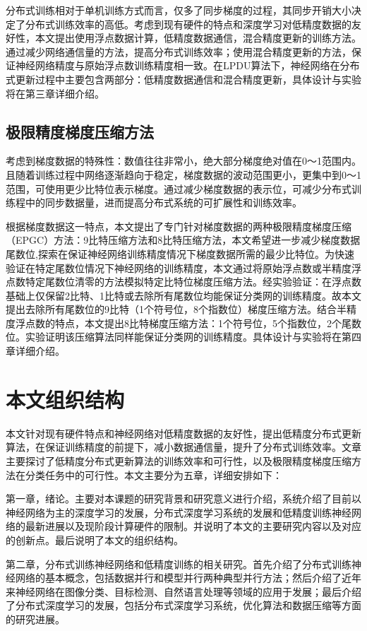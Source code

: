 分布式训练相对于单机训练方式而言，仅多了同步梯度的过程，其同步开销大小决定了分布式训练效率的高低。考虑到现有硬件的特点和深度学习对低精度数据的友好性，本文提出使用浮点数据计算，低精度数据通信，混合精度更新的训练方法。通过减少网络通信量的方法，提高分布式训练效率；使用混合精度更新的方法，保证神经网络精度与原始浮点数训练精度相一致。在LPDU算法下，神经网络在分布式更新过程中主要包含两部分：低精度数据通信和混合精度更新，具体设计与实验将在第三章详细介绍。

\subsection{极限精度梯度压缩方法}
考虑到梯度数据的特殊性：数值往往非常小，绝大部分梯度绝对值在0～1范围内。且随着训练过程中网络逐渐趋向于稳定，梯度数据的波动范围更小，更集中到0～1范围，可使用更少比特位表示梯度。通过减少梯度数据的表示位，可减少分布式训练程中的同步数据量，进而提高分布式系统的可扩展性和训练效率。

根据梯度数据这一特点，本文提出了专门针对梯度数据的两种极限精度梯度压缩（EPGC）方法：9比特压缩方法和8比特压缩方法，本文希望进一步减少梯度数据尾数位,探索在保证神经网络训练精度情况下梯度数据所需的最少比特位。为快速验证在特定尾数位情况下神经网络的训练精度，本文通过将原始浮点数或半精度浮点数特定尾数位清零的方法模拟特定比特位梯度压缩方法。经实验验证：在浮点数基础上仅保留2比特、1比特或去除所有尾数位均能保证分类网的训练精度。故本文提出去除所有尾数位的9比特（1个符号位，8个指数位）梯度压缩方法。结合半精度浮点数的特点，本文提出8比特梯度压缩方法：1个符号位，5个指数位，2个尾数位。实验证明该压缩算法同样能保证分类网的训练精度。具体设计与实验将在第四章详细介绍。

\section{本文组织结构}
本文针对现有硬件特点和神经网络对低精度数据的友好性，提出低精度分布式更新算法，在保证训练精度的前提下，减小数据通信量，提升了分布式训练效率。文章主要探讨了低精度分布式更新算法的训练效率和可行性，以及极限精度梯度压缩方法在分类任务中的可行性。本文主要分为五章，详细安排如下：

第一章，绪论。主要对本课题的研究背景和研究意义进行介绍，系统介绍了目前以神经网络为主的深度学习的发展，分布式深度学习系统的发展和低精度训练神经网络的最新进展以及现阶段计算硬件的限制。并说明了本文的主要研究内容以及对应的创新点。最后说明了本文的组织结构。

第二章，分布式训练神经网络和低精度训练的相关研究。首先介绍了分布式训练神经网络的基本概念，包括数据并行和模型并行两种典型并行方法；然后介绍了近年来神经网络在图像分类、目标检测、自然语言处理等领域的应用于发展；最后介绍了分布式深度学习的发展，包括分布式深度学习系统，优化算法和数据压缩等方面的研究进展。

